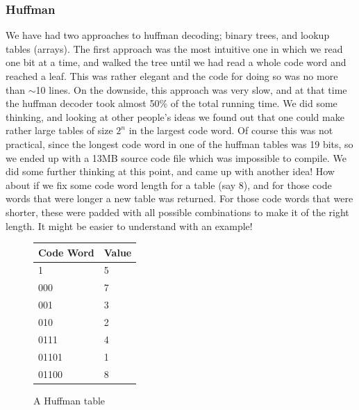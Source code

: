 \documentclass[a4paper,12pt]{article}
\begin{document}
    \subsubsection{Huffman}
    We have had two approaches to huffman decoding; binary trees, and lookup
    tables (arrays). The first approach was the most intuitive one in which we
    read one bit at a time, and walked the tree until we had read a whole code
    word and reached a leaf. This was rather elegant and the code for doing so
    was no more than $\sim$10 lines. On the downside, this approach was very
    slow, and at that time the huffman decoder took almost 50\% of the total
    running time. We did some thinking, and looking at other people's ideas we
    found out that one could make rather large tables of size $2^n$ in the
    largest code word. Of course this was not practical, since the longest code
    word in one of the huffman tables was 19 bits, so we ended up with a 13MB
    source code file which was impossible to compile. We did some further
    thinking at this point, and came up with another idea! How about if we fix
    some code word length for a table (say 8), and for those code words that
    were longer a new table was returned. For those code words that were
    shorter, these were padded with all possible combinations to make it of the
    right length. It might be easier to understand with an example!
\begin{figure}[h]
  \begin{center}
    \begin{tabular}{| l | l |}
        \hline
        Code Word & Value \\ \hline \hline
        1   & 5 \\
        000 & 7 \\
        001 & 3 \\
        010 & 2 \\
        0111  & 4 \\
        01101 & 1 \\
        01100 & 8 \\ \hline
    \end{tabular}
    \caption{A Huffman table}\label{fig:huffmantab}
  \end{center}
\end{figure}
\end{document}
